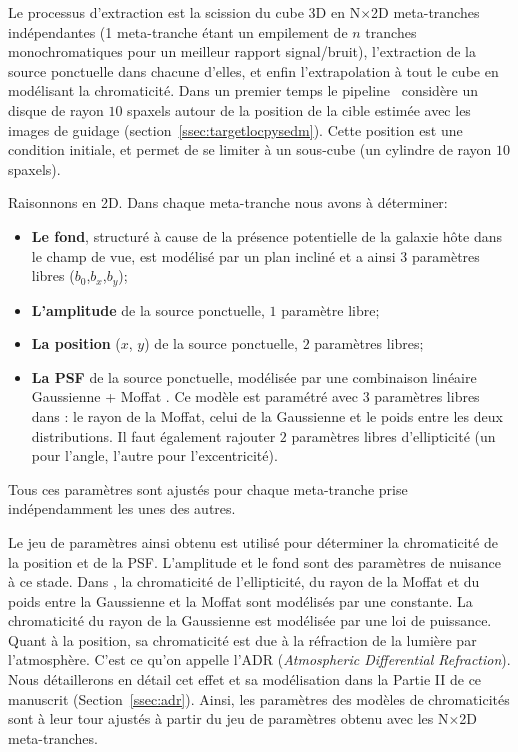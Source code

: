 \documentclass[../main/main.tex]{subfiles}
\begin{document}
Le processus d'extraction est la scission du cube 3D en N$\times$2D
meta-tranches indépendantes (1 meta-tranche étant un empilement de $n$
tranches monochromatiques pour un meilleur rapport signal/bruit), l'extraction de la source ponctuelle dans chacune
d'elles, et enfin l'extrapolation à tout le cube en modélisant la
chromaticité.
Dans un premier temps le pipeline \pysedm\ considère un disque de rayon $10$
spaxels autour de la position de la cible estimée avec les images de
guidage (section~\ref{ssec:targetlocpysedm}). Cette position est une
condition initiale, et permet de se limiter à un sous-cube (un cylindre
de rayon $10$ spaxels).

Raisonnons en 2D. Dans chaque meta-tranche nous avons à déterminer:
\begin{itemize}[label=$\bullet$]
\itemsep0em 
\item \textbf{Le fond}, structuré à cause de la
  présence potentielle de la galaxie hôte dans le champ de vue, est
  modélisé par un plan incliné et a ainsi $3$ paramètres libres ($b_{0}$,$b_{x}$,$b_{y}$);
\item \textbf{L'amplitude} de la source ponctuelle, $1$ paramètre libre;
\item \textbf{La position} ($x$, $y$) de la source ponctuelle, $2$ paramètres libres;
\item \textbf{La PSF} de la source ponctuelle, modélisée par une
  combinaison linéaire Gaussienne + Moffat \citep{Butonthese,Buton2013}. Ce modèle est paramétré avec $3$ paramètres libres
  dans \citet{pysedm}: le rayon de la Moffat, celui de la Gaussienne et
  le poids entre les deux distributions. Il faut également rajouter $2$ paramètres libres
  d'ellipticité (un pour l'angle, l'autre pour l'excentricité).
\end{itemize}

Tous ces paramètres sont ajustés pour chaque meta-tranche prise
indépendamment les unes des autres.

Le jeu de paramètres ainsi obtenu est utilisé pour déterminer la
chromaticité de la position et de la PSF. L'amplitude et
le fond sont des paramètres de nuisance à ce stade.
Dans \pysedm, la chromaticité de l'ellipticité, du rayon de la Moffat et du poids entre la
Gaussienne et la Moffat sont modélisés par une constante. La
chromaticité du rayon de la
Gaussienne est modélisée par une loi de puissance.
Quant à la position, sa chromaticité est due à la réfraction de la
lumière par l'atmosphère. C'est ce qu'on appelle l'ADR (\textit{Atmospheric
Differential Refraction}). Nous détaillerons en détail cet effet et sa
modélisation dans la
Partie II de ce manuscrit (Section~\ref{ssec:adr}).
Ainsi, les paramètres des modèles de chromaticités sont à leur tour
ajustés à partir du jeu de paramètres obtenu avec les N$\times$2D
meta-tranches.
\end{document}

